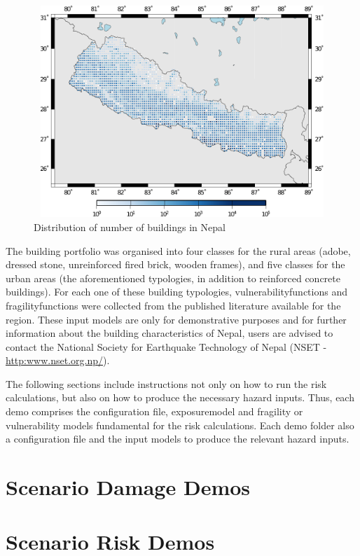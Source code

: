 \begin{figure}[ht]
\centering
\includegraphics[width=12cm,height=8cm]{figures/risk/exposure-nepal.pdf}
\caption{Distribution of number of buildings in Nepal}
\label{fig:exposure-nepal}
\end{figure}

The building portfolio was organised into four classes for the rural areas
(adobe, dressed stone, unreinforced fired brick, wooden frames), and five
classes for the urban areas (the aforementioned typologies, in addition to
reinforced concrete buildings). For each one of these building typologies,
\glspl{vulnerabilityfunction} and \glspl{fragilityfunction} were collected
from the published literature available for the region. These input models are
only for demonstrative purposes and for further information about the building
characteristics of Nepal, users are advised to contact the National Society
for Earthquake Technology of Nepal (NSET -
\href{http://www.nset.org.np/}{http:www.nset.org.np/}).

The following sections include instructions not only on how to run the risk
calculations, but also on how to produce the necessary hazard inputs. Thus,
each demo comprises the configuration file, \gls{exposuremodel} and fragility or
vulnerability models fundamental for the risk calculations. Each demo folder
also a configuration file and the input models to produce the relevant hazard
inputs.


\section{Scenario Damage Demos}
\label{sec:demos_scenario_damage}


\section{Scenario Risk Demos}
\label{sec:demos_scenario_risk}


